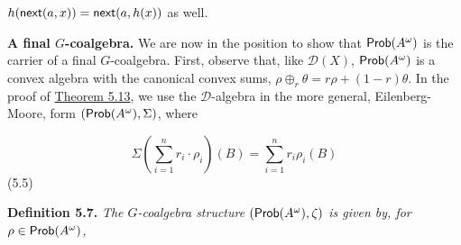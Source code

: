 \hypertarget{html:S5.SS0.SSS0.Px1.p6.m13}{}\({h(\mbox{\sf next}(a,x))=\mbox{\sf next}(a,h(x))}\) as well.
\par\medskip
\hypertarget{html:S5.SS0.SSS0.Px1.SPx1}{} \par\noindent\textbf{A final %
\hypertarget{html:S5.SS0.SSS0.Px1.SPx1.m1}{}\({G}\)-coalgebra.}\quad  %
\hypertarget{html:S5.SS0.SSS0.Px1.SPx1.p1}{} We are now in the position to show that %
\hypertarget{html:S5.SS0.SSS0.Px1.SPx1.p1.m1}{}\({\text{\sf Prob}(A^{\omega})}\) is the carrier of a final %
\hypertarget{html:S5.SS0.SSS0.Px1.SPx1.p1.m2}{}\({G}\)-coalgebra. First, observe that, like %
\hypertarget{html:S5.SS0.SSS0.Px1.SPx1.p1.m3}{}\({{\mathcal{D}}(X)}\), %
\hypertarget{html:S5.SS0.SSS0.Px1.SPx1.p1.m4}{}\({\text{\sf Prob}(A^{\omega})}\) is a convex algebra with the canonical convex sums, %
\hypertarget{html:S5.SS0.SSS0.Px1.SPx1.p1.m5}{}\({\rho\oplus_{r}\theta=r\rho+(1-r)\theta}\). In the proof of \hyperlink{html:S5.Thmtheorem13}{Theorem 5.13}, we use the %
\hypertarget{html:S5.SS0.SSS0.Px1.SPx1.p1.m6}{}\({{\mathcal{D}}}\)-algebra in the more general, Eilenberg-Moore, form %
\hypertarget{html:S5.SS0.SSS0.Px1.SPx1.p1.m7}{}\({(\text{\sf Prob}(A^{\omega}),\Sigma)}\), where
\par\medskip
\hypertarget{html:S5.E5}{}   %
\hypertarget{html:S5.E5.m1}{}\[\Sigma(\sum\limits_{i=1}^{n}r_{i}\cdot\rho_{i})(B)=\sum\limits_{i=1}^{n}r_{i}\rho_{i}(B)\]  (5.5)    %
\hypertarget{html:S5.Thmtheorem7}{} \par\noindent\textbf{\textbf{Definition 5.7}\textbf{.}}\quad  %
\hypertarget{html:S5.Thmtheorem7.p1}{} \emph{The %
\hypertarget{html:S5.Thmtheorem7.p1.m1}{}\({G}\)-coalgebra structure %
\hypertarget{html:S5.Thmtheorem7.p1.m2}{}\({(\text{\sf Prob}(A^{\omega}),\zeta)}\) is given by, for %
\hypertarget{html:S5.Thmtheorem7.p1.m3}{}\({\rho\in\text{\sf Prob}(A^{\omega})}\),}
\par\medskip
